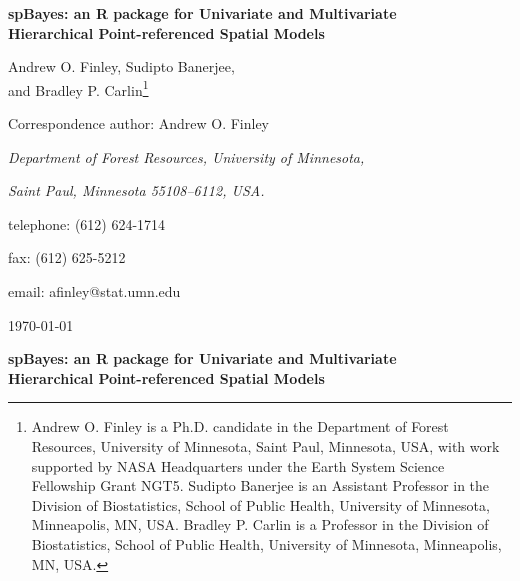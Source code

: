\documentclass[a4paper]{article}
\let\proglang=\textsf
\newcommand{\pkg}[1]{{\normalfont\fontseries{b}\selectfont #1}}
\begin{document}
\thispagestyle{empty}
\setcounter{page}{0}

\begin{center}
{\Large {\bf  \pkg{spBayes}: an \proglang{R} package for Univariate and Multivariate }\\
\vspace{-.1in}
{\bf Hierarchical Point-referenced Spatial Models\\}}

\vspace{0.75in}
{\large {\sc Andrew O. Finley, Sudipto Banerjee,\\}
\vspace{-.1in}
{\sc and Bradley P. Carlin}}\footnote{Andrew O. Finley is a Ph.D. candidate in the Department of Forest Resources, University of Minnesota, Saint Paul, Minnesota, USA, with work supported by NASA Headquarters under the Earth System Science Fellowship Grant NGT5.  Sudipto Banerjee is an Assistant Professor in the Division of Biostatistics, School of Public Health, University of Minnesota, Minneapolis, MN, USA.  Bradley P. Carlin is a Professor in the Division of Biostatistics, School of Public Health, University of Minnesota, Minneapolis, MN, USA.}

\vspace{1.25in} Correspondence author:  Andrew O. Finley

\vspace{-.1in}
{\em Department of Forest Resources, University of Minnesota, \\}

\vspace{-.1in}

{\em Saint Paul, Minnesota 55108--6112, USA.}

\vspace{-.1in} telephone:  (612) 624-1714

\vspace{-.1in} fax: (612) 625-5212

\vspace{-.1in} email: afinley@stat.umn.edu

\vspace{1in} \today
\end{center}


\newpage



\begin{center}
{\Large {\bf  \pkg{spBayes}: an \proglang{R} package for Univariate and Multivariate\\}
\vspace{-.1in}
{\bf Hierarchical Point-referenced Spatial Models\\}}
\end{center}
\end{document}
